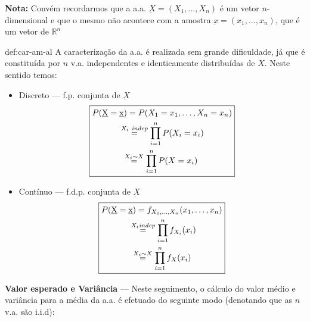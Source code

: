 \noindent\textbf{Nota:} Convém recordarmos que a a.a. $\underbar X = (X_1, \dots, X_n)$ é um vetor $n$-dimensional e que o mesmo não acontece com a amostra $\underbar x = (x_1, \dots, x_n)$, que é um vetor de $\mathbb{R}^n$
\newpage
\begin{theo}{def:car-am-al}\label{def:car-am-al}
    \noindent A caracterização da a.a. é realizada sem grande dificuldade, já que é constituída por $n$ v.a. independentes e identicamente distribuídas de $X$. Neste sentido temos:

    \begin{itemize}
        \item Discreto --- f.p. conjunta de $\underbar{X}$
        $$
            \boxed{%
            \begin{aligned}
                P(\underbar{X} = \underbar{x}) &= P(X_1 = x_1, \dots, X_n = x_n)\\
                &\mkern-18mu\overset{X_i \textit{ indep}}{=} \prod_{i = 1}^{n} P(X_i = x_i)\\
                &\mkern-10.5mu\overset{X_i \sim X}{=} \prod_{i = 1}^{n} P(X = x_i)
            \end{aligned}
            }
        $$

        \item Contínuo --- f.d.p. conjunta de $\underbar{X}$
        $$
            \boxed{%
            \begin{aligned}
                P(\underbar{X} = \underbar{x}) &= f_{X_1, \dots, X_n}(x_1, \dots, x_n) \\
                &\mkern-16mu\overset{X_i \textit{indep}}{=} \prod_{i = 1}^{n} f_{X_i}(x_i) \\
                &\mkern-11mu\overset{X_i \sim X}{=} \prod_{i = 1}^{n} f_{X}(x_i)
            \end{aligned}
            }
        $$
    \end{itemize}
\end{theo}

\noindent\textbf{Valor esperado e Variância} --- Neste seguimento, o cálculo do valor médio e variância para a média da a.a. é efetuado do seguinte modo (denotando que as $n$ v.a. são i.i.d):

